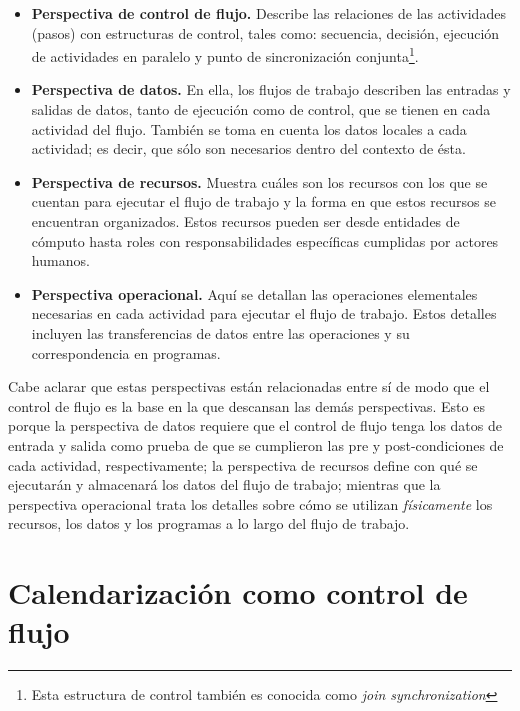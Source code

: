 \documentclass[letterpaper, 12pt]{report}
\begin{document}
\begin{itemize}

\item{\textbf{Perspectiva de control de flujo.} Describe las relaciones de las actividades (pasos) con estructuras de control, tales como: secuencia, decisión, ejecución de actividades en paralelo y punto de sincronización conjunta\footnote{Esta estructura de control también es conocida como \emph{join synchronization}}.}

\item{\textbf{Perspectiva de datos.} En ella, los flujos de trabajo describen las entradas y salidas de datos, tanto de ejecución como de control, que se tienen en cada actividad del flujo. También se toma en cuenta los datos locales a cada actividad; es decir, que sólo son necesarios dentro del contexto de ésta.}

\item{\textbf{Perspectiva de recursos.} Muestra cuáles son los recursos con los que se cuentan para ejecutar el flujo de trabajo y la forma en que estos recursos se encuentran organizados. Estos recursos pueden ser desde entidades de cómputo hasta roles con responsabilidades específicas cumplidas por actores humanos.}

\item{\textbf{Perspectiva operacional.} Aquí se detallan las operaciones elementales necesarias en cada actividad para ejecutar el flujo de trabajo. Estos detalles incluyen las transferencias de datos entre las operaciones y su correspondencia en programas.}

\end{itemize}

Cabe aclarar que estas perspectivas están relacionadas entre sí de modo que el control de flujo es la base en la que descansan las demás perspectivas. Esto es porque la perspectiva de datos requiere que el control de flujo tenga los datos de entrada y salida como prueba de que se cumplieron las pre y post-condiciones de cada actividad, respectivamente; la perspectiva de recursos define con qué se ejecutarán y almacenará los datos del flujo de trabajo; mientras que la perspectiva operacional trata los detalles sobre cómo se utilizan \emph{físicamente} los recursos, los datos y los programas a lo largo del flujo de trabajo.

\section{Calendarización como control de flujo}
\end{document}
